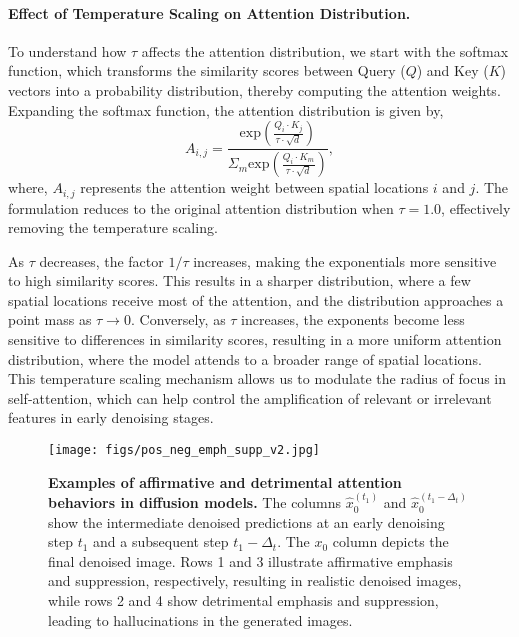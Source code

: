 \paragraph{Effect of Temperature Scaling on Attention Distribution.}
To understand how $\tau$ affects the attention distribution, we start with the softmax function, which transforms the similarity scores between Query ($Q$) and Key ($K$) vectors into a probability distribution, thereby computing the attention weights.
Expanding the softmax function, the attention distribution is given by,
\begin{equation}
    A_{i,j} = \frac{\text{exp} \left ( \frac{Q_i \cdot K_j}{\tau \cdot \sqrt{d}} \right )}{\Sigma_m \text{exp} \left ( \frac{Q_i \cdot K_m}{\tau \cdot \sqrt{d}} \right )},
\end{equation}
where, $A_{i,j}$ represents the attention weight between spatial locations $i$ and $j$. 
The formulation reduces to the original attention distribution when $\tau=1.0$, effectively removing the temperature scaling. 

As $\tau$ decreases, the factor $1/\tau$ increases, making the exponentials more sensitive to high similarity scores. This results in a sharper distribution, where a few spatial locations receive most of the attention, and the distribution approaches a point mass as $\tau \rightarrow 0$.
Conversely, as $\tau$ increases, the exponents become less sensitive to differences in similarity scores, resulting in a more uniform attention distribution, where the model attends to a broader range of spatial locations.
This temperature scaling mechanism allows us to modulate the radius of focus in self-attention, which can help control the amplification of relevant or irrelevant features in early denoising stages. 

\begin{figure}[t]
    \centering
    \texttt{[image: figs/pos\_neg\_emph\_supp\_v2.jpg]}
    \caption{\textbf{Examples of affirmative and detrimental attention behaviors in diffusion models.}  The columns $\hat{x}_0^{(t_1)}$ and $\hat{x}_0^{(t_1-\Delta_t)}$ show the intermediate denoised predictions at an early denoising step $t_1$ and a subsequent step $t_1 - \Delta_t$. The $x_0$ column depicts the final denoised image. Rows 1 and 3 illustrate affirmative emphasis and suppression, respectively, resulting in realistic denoised images,  while rows 2 and 4 show detrimental emphasis and suppression, leading to hallucinations in the generated images. }
    \label{fig:posneg_emphsupp}
    \vspace{-5pt}
\end{figure}

